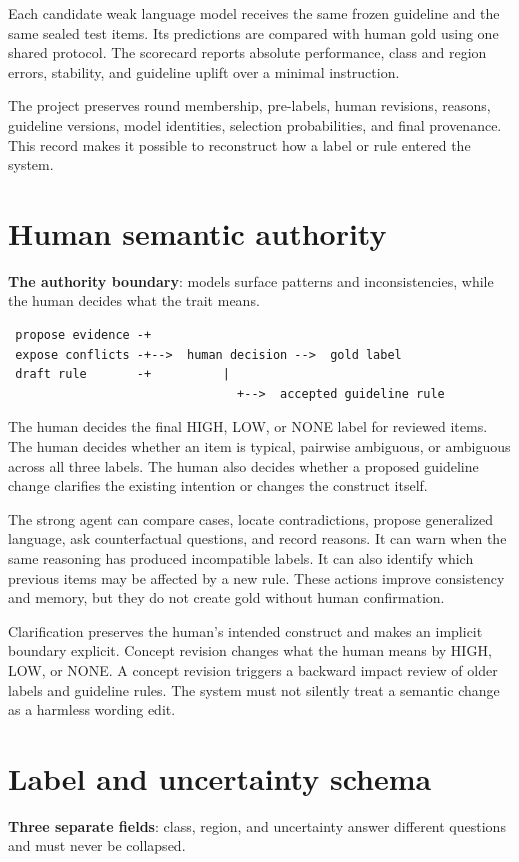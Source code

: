 Each candidate weak language model receives the same frozen guideline and the same sealed test items. Its predictions are compared with human gold using one shared protocol. The scorecard reports absolute performance, class and region errors, stability, and guideline uplift over a minimal instruction.

The project preserves round membership, pre-labels, human revisions, reasons, guideline versions, model identities, selection probabilities, and final provenance. This record makes it possible to reconstruct how a label or rule entered the system.


\section{Human semantic authority}
\textbf{The authority boundary}: models surface patterns and inconsistencies, while the human decides what the trait means.

\begin{verbatim}
 propose evidence -+
 expose conflicts -+-->  human decision -->  gold label
 draft rule       -+          |
                                +-->  accepted guideline rule
\end{verbatim}
The human decides the final HIGH, LOW, or NONE label for reviewed items. The human decides whether an item is typical, pairwise ambiguous, or ambiguous across all three labels. The human also decides whether a proposed guideline change clarifies the existing intention or changes the construct itself.

The strong agent can compare cases, locate contradictions, propose generalized language, ask counterfactual questions, and record reasons. It can warn when the same reasoning has produced incompatible labels. It can also identify which previous items may be affected by a new rule. These actions improve consistency and memory, but they do not create gold without human confirmation.

Clarification preserves the human's intended construct and makes an implicit boundary explicit. Concept revision changes what the human means by HIGH, LOW, or NONE. A concept revision triggers a backward impact review of older labels and guideline rules. The system must not silently treat a semantic change as a harmless wording edit.


\section{Label and uncertainty schema}
\textbf{Three separate fields}: class, region, and uncertainty answer different questions and must never be collapsed.

